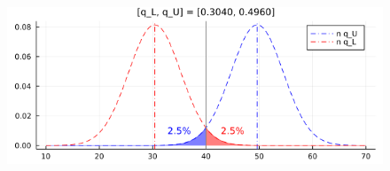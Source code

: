 \documentclass[
  letterpaper,
  DIV=11,
  numbers=noendperiod]{scrartcl}
\begin{document}
\begin{figure}[H]

{\centering \includegraphics{05 Central limit theorem_files/figure-pdf/cell-56-output-1.png}

}

\end{figure}
\end{document}
